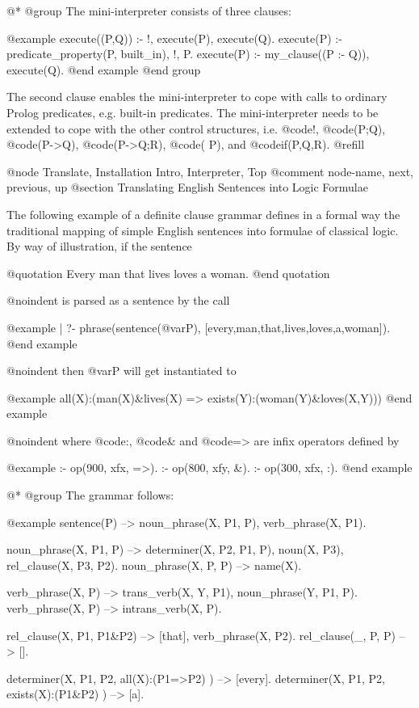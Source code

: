 {{{{{ @*
@group
The mini-interpreter consists of three clauses:  

@example
execute((P,Q)) :- !, execute(P), execute(Q).
execute(P) :- predicate_property(P, built_in), !, P.
execute(P) :- my_clause((P :- Q)), execute(Q).
@end example
@end group

The second clause enables the mini-interpreter to cope with calls to
ordinary Prolog predicates, e.g. built-in predicates.  The
mini-interpreter needs to be extended to cope with the other control
structures, i.e. @code{!}, @code{(P;Q)}, @code{(P->Q)}, @code{(P->Q;R)},
@code{(\+ P)}, and @code{if(P,Q,R)}. @refill

@node Translate, Installation Intro, Interpreter, Top
@comment  node-name,  next,  previous,  up
@section Translating English Sentences into Logic Formulae

The following example of a definite clause grammar defines in a formal way
the traditional mapping of simple English sentences into formulae of
classical logic.  By way of illustration, if the sentence

@quotation
Every man that lives loves a woman.
@end quotation

@noindent
is parsed as a sentence by the call

@example
| ?- phrase(sentence(@var{P}), [every,man,that,lives,loves,a,woman]).
@end example

@noindent
then @var{P} will get instantiated to

@example
all(X):(man(X)&lives(X) => exists(Y):(woman(Y)&loves(X,Y)))
@end example

@noindent
where @code{:}, @code{&} and @code{=>} are infix operators defined by 

@example
:- op(900, xfx, =>).
:- op(800, xfy, &).
:- op(300, xfx, :).
@end example

 @*
@group
The grammar follows:

@example
sentence(P) --> noun_phrase(X, P1, P), verb_phrase(X, P1).

noun_phrase(X, P1, P) -->
        determiner(X, P2, P1, P), noun(X, P3), rel_clause(X, P3, P2).
noun_phrase(X, P, P) --> name(X).

verb_phrase(X, P) --> trans_verb(X, Y, P1), noun_phrase(Y, P1, P).
verb_phrase(X, P) --> intrans_verb(X, P).

rel_clause(X, P1, P1&P2) --> [that], verb_phrase(X, P2).
rel_clause(_, P, P) --> [].

determiner(X, P1, P2, all(X):(P1=>P2) ) --> [every].
determiner(X, P1, P2, exists(X):(P1&P2) ) --> [a].

}}}}}
